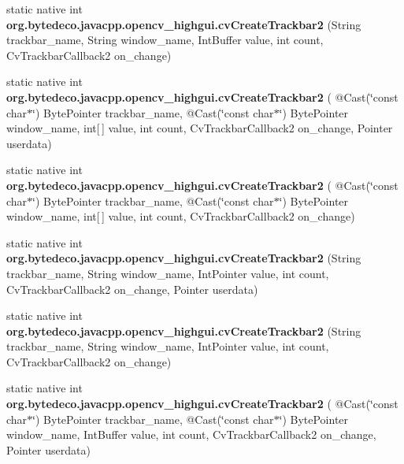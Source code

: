 \begin{DoxyCompactItemize}
\item 
\mbox{\label{group__highgui__c_ga1e44b0110c3def7308f3e9b3ad42811c}} 
static native int {\bfseries org.\+bytedeco.\+javacpp.\+opencv\+\_\+highgui.\+cv\+Create\+Trackbar2} (String trackbar\+\_\+name, String window\+\_\+name, Int\+Buffer value, int count, Cv\+Trackbar\+Callback2 on\+\_\+change)
\item 
\mbox{\label{group__highgui__c_gafa6cf9795cfafd894f1a148287105754}} 
static native int {\bfseries org.\+bytedeco.\+javacpp.\+opencv\+\_\+highgui.\+cv\+Create\+Trackbar2} ( @Cast(\char`\"{}const char$\ast$\char`\"{}) Byte\+Pointer trackbar\+\_\+name, @Cast(\char`\"{}const char$\ast$\char`\"{}) Byte\+Pointer window\+\_\+name, int\mbox{[}$\,$\mbox{]} value, int count, Cv\+Trackbar\+Callback2 on\+\_\+change, Pointer userdata)
\item 
\mbox{\label{group__highgui__c_gadf034a072ceba1f1cae51c1afe4c8842}} 
static native int {\bfseries org.\+bytedeco.\+javacpp.\+opencv\+\_\+highgui.\+cv\+Create\+Trackbar2} ( @Cast(\char`\"{}const char$\ast$\char`\"{}) Byte\+Pointer trackbar\+\_\+name, @Cast(\char`\"{}const char$\ast$\char`\"{}) Byte\+Pointer window\+\_\+name, int\mbox{[}$\,$\mbox{]} value, int count, Cv\+Trackbar\+Callback2 on\+\_\+change)
\item 
\mbox{\label{group__highgui__c_ga39d127e24c38f64b13355c7993cb383d}} 
static native int {\bfseries org.\+bytedeco.\+javacpp.\+opencv\+\_\+highgui.\+cv\+Create\+Trackbar2} (String trackbar\+\_\+name, String window\+\_\+name, Int\+Pointer value, int count, Cv\+Trackbar\+Callback2 on\+\_\+change, Pointer userdata)
\item 
\mbox{\label{group__highgui__c_ga47ad93ba837f0e45667261f5d0c61d3f}} 
static native int {\bfseries org.\+bytedeco.\+javacpp.\+opencv\+\_\+highgui.\+cv\+Create\+Trackbar2} (String trackbar\+\_\+name, String window\+\_\+name, Int\+Pointer value, int count, Cv\+Trackbar\+Callback2 on\+\_\+change)
\item 
\mbox{\label{group__highgui__c_gaf55bdf25cae0ebb71b1edb9f6141b7ba}} 
static native int {\bfseries org.\+bytedeco.\+javacpp.\+opencv\+\_\+highgui.\+cv\+Create\+Trackbar2} ( @Cast(\char`\"{}const char$\ast$\char`\"{}) Byte\+Pointer trackbar\+\_\+name, @Cast(\char`\"{}const char$\ast$\char`\"{}) Byte\+Pointer window\+\_\+name, Int\+Buffer value, int count, Cv\+Trackbar\+Callback2 on\+\_\+change, Pointer userdata)

\end{DoxyCompactItemize}
